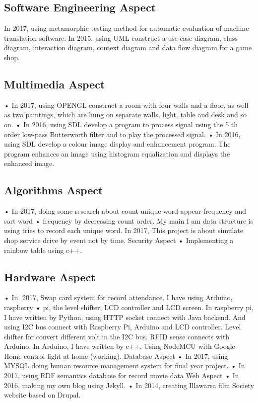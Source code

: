 \documentclass[]{friggeri-cv}
\begin{document}
\subsection*{Software Engineering Aspect}
In 2017, using metamorphic testing method for automatic evaluation of machine translation software.
In 2015, using UML construct a use case diagram, class diagram, interaction diagram, context diagram and data flow diagram for a game shop.

\subsection{Multimedia Aspect}
• In 2017, using OPENGL construct a room with four walls and a floor, as well as two paintings, which are hung on separate walls, light, table and desk and so on.
• In 2016, using SDL develop a program to process signal using the 5 th order low-pass Butterworth filter and to play the processed signal.
• In 2016, using SDL develop a colour image display and enhancement program. The program enhances an image using histogram equalization and displays the enhanced image.

\subsection{Algorithms Aspect}
• In 2017, doing some research about count unique word appear frequency and sort word
• frequency by decreasing count order. My main I am data structure is using tries to record each unique word.
In 2017, This project is about simulate shop service drive by event not by time.
Security Aspect
• Implementing a rainbow table using c++.

\subsection{Hardware Aspect}
• In. 2017, Swap card system for record attendance. I have using Arduino, raspberry
• pi, the level shifter, LCD controller and LCD screen. In raspberry pi, I have written by Python, using HTTP socket connect with Java backend. And using I2C bus connect with Raspberry Pi, Arduino and LCD controller. Level shifter for convert different volt in the I2C bus. RFID sense connects with Arduino. In Arduino, I have written by c++.
Using NodeMCU with Google Home control light at home (working).
Database Aspect
• In 2017, using MYSQL doing human resource management system for final year project. • In 2017, using RDF semantics database for record movie data
Web Aspect
• In 2016, making my own blog using Jekyll.
• In 2014, creating Illawarra film Society website based on Drupal.
\end{document}
